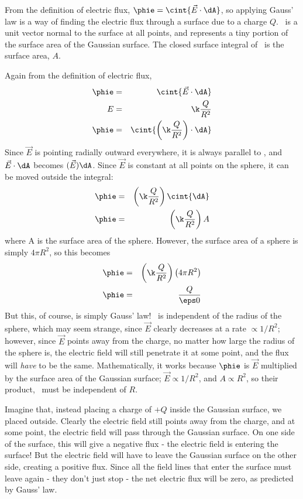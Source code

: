 \documentclass[12pt]{article}
\begin{document}
From the definition of electric flux, $\displaystyle \phie=\cint{\vec{E}\cdot \dA}$, so applying Gauss' law is a way of finding the electric flux through a surface due to a charge $Q$. \dA \ is a unit vector normal to the surface at all points, and represents a tiny portion of the surface area of the Gaussian surface. The closed surface integral of \dA \ is the surface area, $A$.

Again from the definition of electric flux,
\begin{eqnarray*}
\phie &=& \cint{\vec{E}\cdot\dA}\\
E &=& \k \frac{Q}{R^2}\\
\phie &=& \cint{\left(\k \frac{Q}{R^2}\right)\cdot\dA}\\
\end{eqnarray*}
Since $\vec{E}$ is pointing radially outward everywhere, it is always parallel to \dA, and $\vec{E}\cdot\dA$ becomes $(\vec{E})\dA$. Since $\vec{E}$ is constant at all points on the sphere, it can be moved outside the integral:
\begin{eqnarray*}
\phie &=& \left(\k \frac{Q}{R^2}\right)\cint{\dA}\\
\phie &=& \left(\k \frac{Q}{R^2}\right)A\\
\end{eqnarray*}
where A is the surface area of the sphere. However, the surface area of a sphere is simply $4\pi R^2$, so this becomes
\begin{eqnarray*}
\phie &=& \left(\k \frac{Q}{R^2}\right)\left(4\pi R^2\right)\\
\phie &=& \frac{Q}{\eps0}\\
\end{eqnarray*}
But this, of course, is simply Gauss' law! \phie \ is independent of the radius of the sphere, which may seem strange, since $\vec{E}$ clearly decreases at a rate $\propto 1/R^2$; however, since $\vec{E}$ points away from the charge, no matter how large the radius of the sphere is, the electric field will still penetrate it at some point, and the flux will \textit{have} to be the same. Mathematically, it works because $\phie$ is $\vec{E}$ multiplied by the surface area of the Gaussian surface; $\vec{E} \propto 1/R^2$, and $A\propto R^2$, so their product, \phie \ must be independent of $R$.

Imagine that, instead placing a charge of $+Q$ inside the Gaussian surface, we placed outside. Clearly the electric field still points away from the charge, and at some point, the electric field will pass through the Gaussian surface. On one side of the surface, this will give a negative flux - the electric field is entering the surface! But the electric field will have to leave the Gaussian surface on the other side, creating a positive flux. Since all the field lines that enter the surface must leave again - they don't just stop - the net electric flux will be zero, as predicted by Gauss' law.
\end{document}
